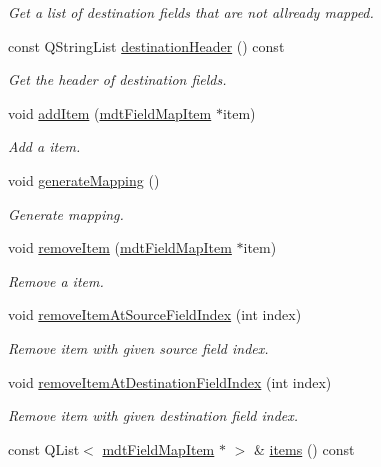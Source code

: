 \begin{DoxyCompactItemize}
\begin{DoxyCompactList}\small\item\em Get a list of destination fields that are not allready mapped. \end{DoxyCompactList}\item 
const QStringList \hyperlink{classmdt_field_map_a1b5a0b01a2583173328362b3f86cec3d}{destinationHeader} () const 
\begin{DoxyCompactList}\small\item\em Get the header of destination fields. \end{DoxyCompactList}\item 
void \hyperlink{classmdt_field_map_a6914818142ea30f7bce6a012be9fb69f}{addItem} (\hyperlink{classmdt_field_map_item}{mdtFieldMapItem} $\ast$item)
\begin{DoxyCompactList}\small\item\em Add a item. \end{DoxyCompactList}\item 
void \hyperlink{classmdt_field_map_ae994e83a8aa622b2c0a5c5ea035c1d04}{generateMapping} ()
\begin{DoxyCompactList}\small\item\em Generate mapping. \end{DoxyCompactList}\item 
void \hyperlink{classmdt_field_map_a3a84daf167cac6cd0c5fdd9778562e73}{removeItem} (\hyperlink{classmdt_field_map_item}{mdtFieldMapItem} $\ast$item)
\begin{DoxyCompactList}\small\item\em Remove a item. \end{DoxyCompactList}\item 
void \hyperlink{classmdt_field_map_a4207bf588bd5e69d3f771aa2048ad3dc}{removeItemAtSourceFieldIndex} (int index)
\begin{DoxyCompactList}\small\item\em Remove item with given source field index. \end{DoxyCompactList}\item 
void \hyperlink{classmdt_field_map_a09eb97d391bad004d5812b2030420aed}{removeItemAtDestinationFieldIndex} (int index)
\begin{DoxyCompactList}\small\item\em Remove item with given destination field index. \end{DoxyCompactList}\item 
\hypertarget{classmdt_field_map_a45807e5ef0aee1a46bb587b5fc9e4504}{
const QList$<$ \hyperlink{classmdt_field_map_item}{mdtFieldMapItem} $\ast$ $>$ \& \hyperlink{classmdt_field_map_a45807e5ef0aee1a46bb587b5fc9e4504}{items} () const }
\label{classmdt_field_map_a45807e5ef0aee1a46bb587b5fc9e4504}


\end{DoxyCompactItemize}
